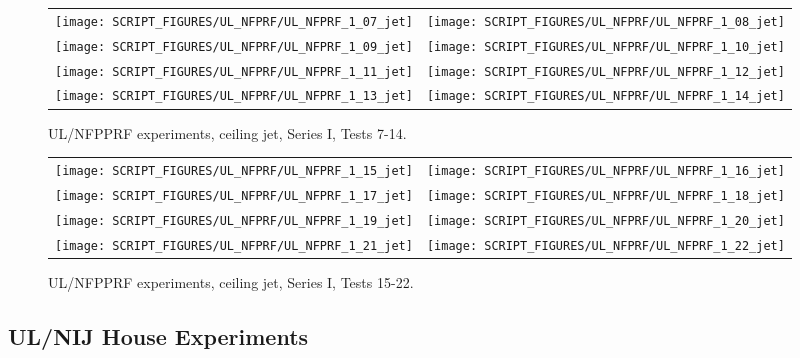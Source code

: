 \newpage

\begin{figure}[p]
\begin{tabular*}{\textwidth}{l@{\extracolsep{\fill}}r}
\texttt{[image: SCRIPT\_FIGURES/UL\_NFPRF/UL\_NFPRF\_1\_07\_jet]} &
\texttt{[image: SCRIPT\_FIGURES/UL\_NFPRF/UL\_NFPRF\_1\_08\_jet]} \\
\texttt{[image: SCRIPT\_FIGURES/UL\_NFPRF/UL\_NFPRF\_1\_09\_jet]} &
\texttt{[image: SCRIPT\_FIGURES/UL\_NFPRF/UL\_NFPRF\_1\_10\_jet]} \\
\texttt{[image: SCRIPT\_FIGURES/UL\_NFPRF/UL\_NFPRF\_1\_11\_jet]} &
\texttt{[image: SCRIPT\_FIGURES/UL\_NFPRF/UL\_NFPRF\_1\_12\_jet]} \\
\texttt{[image: SCRIPT\_FIGURES/UL\_NFPRF/UL\_NFPRF\_1\_13\_jet]} &
\texttt{[image: SCRIPT\_FIGURES/UL\_NFPRF/UL\_NFPRF\_1\_14\_jet]}
\end{tabular*}
\caption[UL/NFPPRF experiments, ceiling jet, Series I, Tests 7-14]{UL/NFPPRF experiments, ceiling jet, Series I, Tests 7-14.}
\label{UL_NFPRF_jet_2}
\end{figure}

\begin{figure}[p]
\begin{tabular*}{\textwidth}{l@{\extracolsep{\fill}}r}
\texttt{[image: SCRIPT\_FIGURES/UL\_NFPRF/UL\_NFPRF\_1\_15\_jet]} &
\texttt{[image: SCRIPT\_FIGURES/UL\_NFPRF/UL\_NFPRF\_1\_16\_jet]} \\
\texttt{[image: SCRIPT\_FIGURES/UL\_NFPRF/UL\_NFPRF\_1\_17\_jet]} &
\texttt{[image: SCRIPT\_FIGURES/UL\_NFPRF/UL\_NFPRF\_1\_18\_jet]} \\
\texttt{[image: SCRIPT\_FIGURES/UL\_NFPRF/UL\_NFPRF\_1\_19\_jet]} &
\texttt{[image: SCRIPT\_FIGURES/UL\_NFPRF/UL\_NFPRF\_1\_20\_jet]} \\
\texttt{[image: SCRIPT\_FIGURES/UL\_NFPRF/UL\_NFPRF\_1\_21\_jet]} &
\texttt{[image: SCRIPT\_FIGURES/UL\_NFPRF/UL\_NFPRF\_1\_22\_jet]}
\end{tabular*}
\caption[UL/NFPPRF experiments, ceiling jet, Series I, Tests 15-22]{UL/NFPPRF experiments, ceiling jet, Series I, Tests 15-22.}
\label{UL_NFPRF_jet_3}
\end{figure}


\clearpage

\subsection{UL/NIJ House Experiments}

